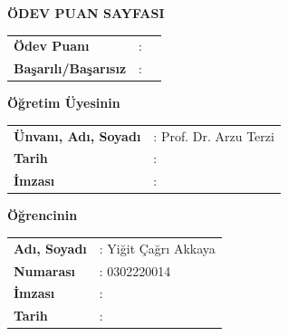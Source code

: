 \begin{center}
    \textbf{\large ÖDEV PUAN SAYFASI}
\end{center}

\vspace{2cm}

\noindent
\begin{tabular}{@{} p{9.7cm} l l @{}}
\textbf{Ödev Puanı} & : & \\[0.6cm]
\textbf{Başarılı/Başarısız} & : & \\[0.6cm]
\end{tabular}

\vspace{2cm}

\noindent
\textbf{Öğretim Üyesinin}

\vspace{0.8cm}

\hspace*{3cm}
\begin{tabular}{@{} p{6cm} l @{}}
\textbf{Ünvanı, Adı, Soyadı} & : Prof. Dr. Arzu Terzi\\[0.6cm]
\textbf{Tarih} & : \\[0.6cm]
\textbf{İmzası} & :
\end{tabular}

\vspace{2.5cm}

\noindent
\textbf{Öğrencinin}

\vspace{0.8cm}

\hspace*{3cm}
\begin{tabular}{@{} p{6cm} l @{}}
\textbf{Adı, Soyadı} & : Yiğit Çağrı Akkaya \\[0.6cm]
\textbf{Numarası} & : 0302220014\\[0.6cm]
\textbf{İmzası} & : \\[0.6cm]
\textbf{Tarih} & : \\[0.6cm]
\end{tabular}
\clearpage
